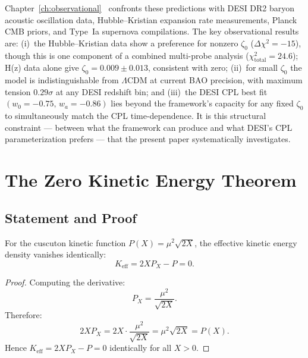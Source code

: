 Chapter~\ref{ch:observational}~\cite{ch3:paper2} confronts these predictions with DESI DR2 baryon acoustic oscillation data, Hubble--Kristian expansion rate measurements, Planck CMB priors, and Type~Ia supernova compilations. The key observational results are: (i)~the Hubble--Kristian data show a preference for nonzero $\zeta_0$ ($\Delta\chi^2 = -15$), though this is one component of a combined multi-probe analysis ($\chi^2_{\mathrm{total}} = 24.6$); H(z) data alone give $\zeta_0 = 0.009 \pm 0.013$, consistent with zero; (ii)~for small $\zeta_0$ the model is indistinguishable from $\Lambda$CDM at current BAO precision, with maximum tension $0.29\sigma$ at any DESI redshift bin; and (iii)~the DESI CPL best fit $(w_0 = -0.75,\, w_a = -0.86)$ lies beyond the framework's capacity for any fixed $\zeta_0$ to simultaneously match the CPL time-dependence. It is this structural constraint --- between what the framework can produce and what DESI's CPL parameterization prefers --- that the present paper systematically investigates.

\section{The Zero Kinetic Energy Theorem}
\label{sec:3-zke}

\subsection{Statement and Proof}
\label{sec:3-zke-statement}

\begin{proposition}
\label{thm:zke}
For the cuscuton kinetic function $P(X) = \mu^2\sqrt{2X}$, the effective kinetic energy density vanishes identically:
\begin{equation}
  K_{\mathrm{eff}} = 2X P_X - P = 0.
  \label{eq:3-01}
\end{equation}
\end{proposition}

\begin{proof}
Computing the derivative:
\begin{equation}
  P_X = \frac{\mu^2}{\sqrt{2X}}.
  \label{eq:3-02}
\end{equation}
Therefore:
\begin{equation}
  2X P_X = 2X \cdot \frac{\mu^2}{\sqrt{2X}} = \mu^2\sqrt{2X} = P(X).
  \label{eq:3-03}
\end{equation}
Hence $K_{\mathrm{eff}} = 2X P_X - P = 0$ identically for all $X > 0$.
\end{proof}

